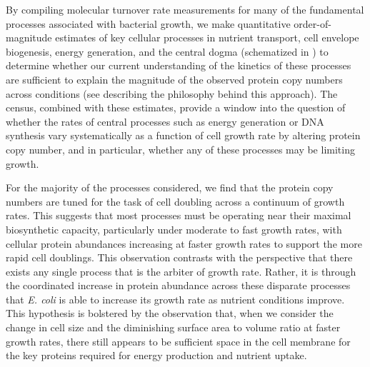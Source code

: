 By compiling molecular turnover rate measurements for many of the
fundamental processes associated with bacterial growth, we make quantitative
order-of-magnitude estimates of key cellular processes in nutrient transport,
cell envelope biogenesis, energy generation, and the central dogma (schematized
in ) to determine whether our current understanding of the
kinetics of these processes are sufficient to explain the magnitude of the
observed protein copy numbers across conditions (see 
describing the philosophy behind this approach). The census, combined with these
estimates, provide a window into the question of whether the rates of central
processes such as energy generation or DNA synthesis vary systematically as a
function of cell growth rate by altering protein copy number, and in particular,
whether any of these processes may be limiting growth.

For the majority of the processes considered, we find that the protein copy
numbers are tuned for the task of cell doubling across a continuum of growth
rates. This suggests that most processes must be operating near their maximal
biosynthetic capacity, particularly under moderate to fast growth rates, with
cellular protein abundances increasing at faster growth rates to support the
more rapid cell doublings. This observation contrasts with the perspective
that there exists any single process that is the arbiter of growth rate.
Rather, it is through the coordinated increase in protein abundance across
these disparate processes that \textit{E. coli} is able to increase its
growth rate as nutrient conditions improve. This hypothesis is bolstered by
the observation that, when we consider the change in cell size and the
diminishing surface area to volume ratio at faster growth rates, there still
appears to be sufficient space in the cell membrane for the key proteins
required for energy production and nutrient uptake.

